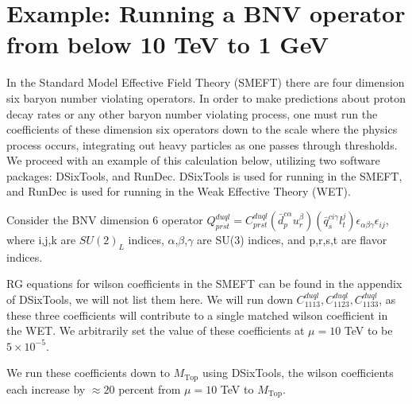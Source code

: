 \documentclass[aps,onecolumn,twoside,secnumarabic,balancelastpage,amsmath,amssymb,nofootinbib,hyperref=pdftex]{revtex4}
\begin{document}
\title{}
\author         {Noah Steinberg}
\date{\today}

\maketitle

\section{Example: Running a BNV operator from below 10 TeV to 1 GeV }
In the Standard Model Effective Field Theory (SMEFT) there are four dimension six baryon number violating operators. In order to make predictions about proton decay rates or any other baryon number violating process, one must run the coefficients of these dimension six operators down to the scale where the physics process occurs, integrating out heavy particles as one passes through thresholds. We proceed with an example of this calculation below, utilizing two software packages: DSixTools\cite{DSixTools}, and RunDec\cite{RunDec}. DSixTools is used for running in the SMEFT, and RunDec is used for running in the Weak Effective Theory (WET). 
\newline

Consider the BNV dimension 6 operator $Q^{duql}_{prst} = C^{duql}_{prst}(\bar{d}^{c\alpha}_{p}u^{\beta}_{r})(\bar{q}^{ci\gamma}_{s}l^{j}_{t})\epsilon_{\alpha\beta\gamma}\epsilon_{ij}$, where i,j,k are $SU(2)_{L}$ indices, $\alpha$,$\beta$,$\gamma$ are SU(3) indices, and p,r,s,t are flavor indices.
\newline

RG equations for wilson coefficients in the SMEFT can be found in the appendix of DSixTools\cite{DSixTools}, we will not list them here. We will run down $C^{duql}_{1113}, C^{duql}_{1123}, C^{duql}_{1133}$, as these three coefficients will contribute to a single matched wilson coefficient in the WET. We arbitrarily set the value of these coefficients at $\mu = 10$ TeV to be $5\times10^{-5}$.
\newline

We run these coefficients down to $M_{\text{Top}}$ using DSixTools, the wilson coefficients each increase by $\approx 20$ percent from $\mu = 10$ TeV to $M_{\text{Top}}$.
\end{document}
